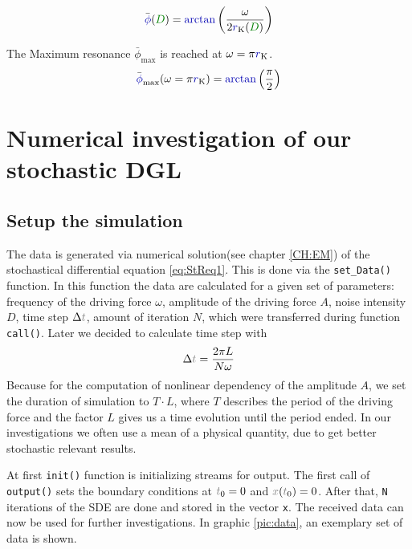 \documentclass[10pt,fleqn,%
reqno,a4paper]{article}
\makeatletter
\def\mathcolor#1#{\@mathcolor{#1}}
\def\@mathcolor#1#2#3{%
        \protect\leavevmode
        \begingroup\color#1{#2}#3\endgroup
}
\newcommand{\nx}{\mathcolor{gray}{x}}
\newcommand{\nt}{\mathcolor{gray}{t}}
\newcommand{\narctan}{\mathcolor{blue!70!black}{\arctan}}
\newcommand{\nphi}{\mathcolor{blue!70!black}{\phi}}
\newcommand{\nr}{\mathcolor{blue!70!black}{r}}
\newcommand{\nD}{\mathcolor{green!50!black}{D}}
\makeatother
\begin{document}
\begin{align} \label{eq:phi}
\bar{\nphi}(\nD)= \narctan\left(\frac{\omega}{2 \nr_{\mathrm{K}}(\nD)}\right)
\end{align}

The Maximum resonance $ \bar{\phi}_{\mathrm{max}} $ is reached at $\omega=\pi \nr_{\mathrm{K}}$. %
\begin{align}
	\bar{\nphi}_{\mathrm{max}}(\omega=\pi \nr_{\mathrm{K}}) = \narctan \left(\frac{\pi}{2}\right)
\end{align}
\newpage
\section{Numerical investigation of our stochastic DGL}

\subsection{Setup the simulation} \label{CH:Data_generation}
The data is generated via numerical solution(see chapter \ref{CH:EM}) of the stochastical differential equation \eqref{eq:StReq1}. 
This is done via the \texttt{set\_Data()} function. In this function the data are calculated for a given set of parameters: frequency of the driving force $ \omega $, amplitude of the driving force $ A $, noise intensity $ D $, time step $ \Delta \nt $, amount of iteration $ N $, which were transferred during function \texttt{call()}. 
Later we decided to calculate time step with
\begin{align*}
	\Delta \nt = \frac{2\pi L}{N \omega} 
\end{align*}
Because for the computation of nonlinear dependency of the amplitude $ A $, we set the duration of simulation to $ T\cdot L $, where $ T $ describes the period of the driving force and the factor $ L $ gives us a time evolution until the period ended.  
In our investigations we often use a mean of a physical quantity, due to get better stochastic relevant results. 

 At first \texttt{init()} function is initializing streams for output. The first call of \texttt{output()} sets the boundary conditions at $\nt_0=0$ and $ \nx (\nt_{0})=0 $. After that, \texttt{N} iterations of the SDE are done and stored in the vector \texttt{x}. 
The received data can now be used for further investigations.
In graphic \ref{pic:data}, an exemplary set of data is shown.
\end{document}
